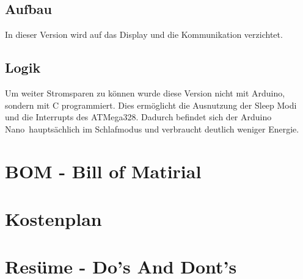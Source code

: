 \documentclass[]{IEEEtran}
\begin{document}
	\subsection{Aufbau}
	In dieser Version wird auf das Display und die Kommunikation verzichtet.
	
	\subsection{Logik}
	Um weiter Stromsparen zu können wurde diese Version nicht mit Arduino, sondern mit C programmiert.
	Dies ermöglicht die Ausnutzung der Sleep Modi und die Interrupts des ATMega328. 
	Dadurch befindet sich der \glqq Arduino Nano\grqq \ hauptsächlich im Schlafmodus und verbraucht deutlich weniger Energie. 
	
	\section{BOM - Bill of Matirial}
	
	\section{Kostenplan}
	
	\section{Resüme - Do's And Dont's}	
\end{document}
